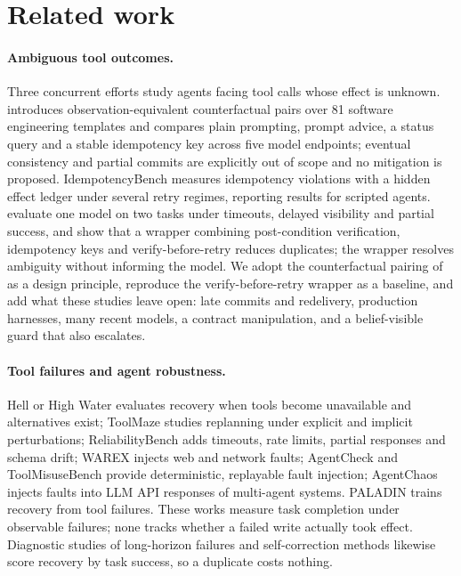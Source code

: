 \section{Related work}
\label{sec:related}

\paragraph{Ambiguous tool outcomes.} Three concurrent efforts study agents facing tool calls whose effect is
unknown. \citet{sun2026didithappen} introduces observation-equivalent counterfactual pairs over 81 software
engineering templates and compares plain prompting, prompt advice, a status query and a stable idempotency key
across five model endpoints; eventual consistency and partial commits are explicitly out of scope and no
mitigation is proposed. IdempotencyBench \citep{gopnalswamy2026idempotencybench} measures idempotency
violations with a hidden effect ledger under several retry regimes, reporting results for scripted agents.
\citet{mansoor2026verified} evaluate one model on two tasks under timeouts, delayed visibility and partial
success, and show that a wrapper combining post-condition verification, idempotency keys and verify-before-retry
reduces duplicates; the wrapper resolves ambiguity without informing the model. We adopt the counterfactual
pairing of \citet{sun2026didithappen} as a design principle, reproduce the verify-before-retry wrapper as a
baseline, and add what these studies leave open: late commits and redelivery, production harnesses, many
recent models, a contract manipulation, and a belief-visible guard that also escalates.

\paragraph{Tool failures and agent robustness.} Hell or High Water \citep{wang2025hell} evaluates recovery
when tools become unavailable and alternatives exist; ToolMaze \citep{zhu2026toolmaze} studies replanning under
explicit and implicit perturbations; ReliabilityBench \citep{gupta2026reliabilitybench} adds timeouts, rate
limits, partial responses and schema drift; WAREX \citep{kara2026warex} injects web and network faults;
AgentCheck \citep{mazumder2026agentcheck} and ToolMisuseBench \citep{sigdel2026toolmisuse} provide
deterministic, replayable fault injection; AgentChaos \citep{tan2026agentchaos} injects faults into LLM API
responses of multi-agent systems. PALADIN \citep{vuddanti2025paladin} trains recovery from tool failures.
These works measure task completion under observable failures; none tracks whether a failed write actually
took effect. Diagnostic studies of long-horizon failures \citep{wang2026horizon,zhu2025agentdebug} and
self-correction methods \citep{shinn2023reflexion,gou2024critic} likewise score recovery by task success, so a
duplicate costs nothing.

